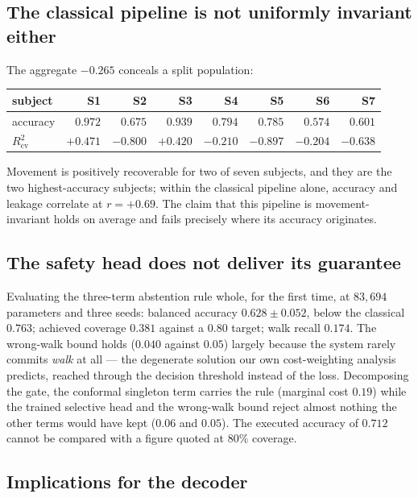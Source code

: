 \documentclass[journal]{IEEEtran}
\begin{document}
\subsection{The classical pipeline is not uniformly invariant either}

The aggregate $-0.265$ conceals a split population:

\begin{center}
\begin{tabular}{lrrrrrrr}
\toprule
subject & S1 & S2 & S3 & S4 & S5 & S6 & S7 \\
\midrule
accuracy            & $0.972$ & $0.675$ & $0.939$ & $0.794$ & $0.785$ & $0.574$ & $0.601$ \\
$R^2_{\mathrm{cv}}$ & $+0.471$& $-0.800$& $+0.420$& $-0.210$& $-0.897$& $-0.204$& $-0.638$ \\
\bottomrule
\end{tabular}
\end{center}

Movement is positively recoverable for two of seven subjects, and they are the two
highest-accuracy subjects; within the classical pipeline alone, accuracy and leakage
correlate at $r = +0.69$. The claim that this pipeline is movement-invariant holds on
average and fails precisely where its accuracy originates.

\subsection{The safety head does not deliver its guarantee}

Evaluating the three-term abstention rule whole, for the first time, at $83{,}694$
parameters and three seeds: balanced accuracy $0.628 \pm 0.052$, below the classical
$0.763$; achieved coverage $0.381$ against a $0.80$ target; walk recall $0.174$. The
wrong-walk bound holds ($0.040$ against $0.05$) largely because the system rarely
commits \emph{walk} at all --- the degenerate solution our own cost-weighting analysis
predicts, reached through the decision threshold instead of the loss. Decomposing the
gate, the conformal singleton term carries the rule (marginal cost $0.19$) while the
trained selective head and the wrong-walk bound reject almost nothing the other terms
would have kept ($0.06$ and $0.05$). The executed accuracy of $0.712$ cannot be
compared with a figure quoted at $80\%$ coverage.

\subsection{Implications for the decoder}
\end{document}
